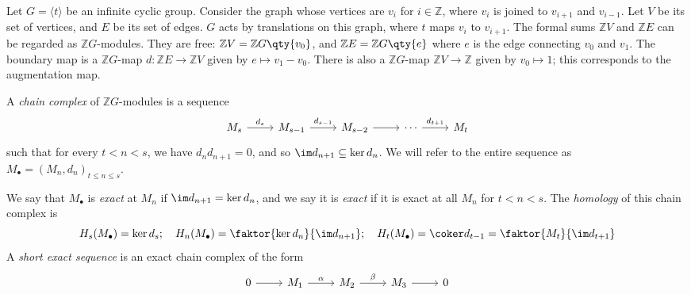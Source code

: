 \begin{example}
    Let \( G = \langle t \rangle \) be an infinite cyclic group.
    Consider the graph whose vertices are \( v_i \) for \( i \in \mathbb Z \), where \( v_i \) is joined to \( v_{i+1} \) and \( v_{i-1} \).
    Let \( V \) be its set of vertices, and \( E \) be its set of edges.
    \( G \) acts by translations on this graph, where \( t \) maps \( v_i \) to \( v_{i+1} \).
    The formal sums \( \mathbb Z V \) and \( \mathbb Z E \) can be regarded as \( \mathbb Z G \)-modules.
    They are free: \( \mathbb Z V = \mathbb Z G \qty{v_0} \), and \( \mathbb Z E = \mathbb Z G \qty{e} \) where \( e \) is the edge connecting \( v_0 \) and \( v_1 \).
    The boundary map is a \( \mathbb Z G \)-map \( d : \mathbb Z E \to \mathbb Z V \) given by \( e \mapsto v_1 - v_0 \).
    There is also a \( \mathbb Z G \)-map \( \mathbb Z V \to \mathbb Z \) given by \( v_0 \mapsto 1 \); this corresponds to the augmentation map.
\end{example}
\begin{definition}
    A \emph{chain complex} of \( \mathbb Z G \)-modules is a sequence
    \[\begin{tikzcd}
        {M_s} & {M_{s-1}} & {M_{s-2}} & \cdots & {M_t}
        \arrow["{d_s}", from=1-1, to=1-2]
        \arrow["{d_{s-1}}", from=1-2, to=1-3]
        \arrow[from=1-3, to=1-4]
        \arrow["{d_{t+1}}", from=1-4, to=1-5]
    \end{tikzcd}\]
    such that for every \( t < n < s \), we have \( d_n d_{n+1} = 0 \), and so \( \im d_{n+1} \subseteq \ker d_n \).
    We will refer to the entire sequence as \( M_\bullet = (M_n, d_n)_{t \leq n \leq s} \).
\end{definition}
We say that \( M_\bullet \) is \emph{exact} at \( M_n \) if \( \im d_{n+1} = \ker d_n \), and we say it is \emph{exact} if it is exact at all \( M_n \) for \( t < n < s \).
The \emph{homology} of this chain complex is
\[ H_s(M_\bullet) = \ker d_s;\quad H_n(M_\bullet) = \faktor{\ker d_n}{\im d_{n+1}};\quad H_t(M_\bullet) = \coker d_{t-1} = \faktor{M_t}{\im d_{t+1}} \]
A \emph{short exact sequence} is an exact chain complex of the form
\[\begin{tikzcd}
0 & {M_1} & {M_2} & {M_3} & 0
\arrow[from=1-1, to=1-2]
\arrow["\alpha", from=1-2, to=1-3]
\arrow["\beta", from=1-3, to=1-4]
\arrow[from=1-4, to=1-5]
\end{tikzcd}\]
